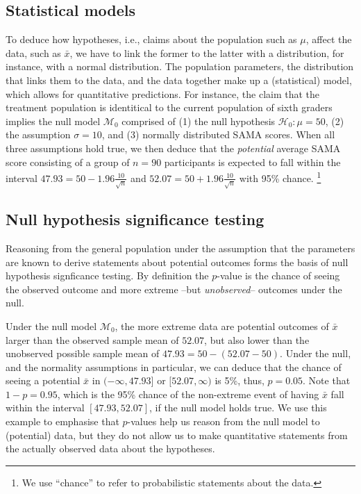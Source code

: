 \documentclass[english,,doc,floatsintext]{apa6}
\let\rmarkdownfootnote\footnote%
\def\footnote{\protect\rmarkdownfootnote}
\begin{document}
\hypertarget{statistical-models}{%
\subsection{Statistical models}\label{statistical-models}}

To deduce how hypotheses, i.e., claims about the population such as \(\mu\), affect the data, such as \(\bar{x}\), we have to link the former to the latter with a distribution, for instance, with a normal distribution. The population parameters, the distribution that links them to the data, and the data together make up a (statistical) model, which allows for quantitative predictions. For instance, the claim that the treatment population is identitical to the current population of sixth graders implies the null model \(\mathcal{M}_{0}\) comprised of (1) the null hypothesis \(\mathcal{H}_{0}: \mu = 50\), (2) the assumption \(\sigma = 10\), and (3) normally distributed SAMA scores. When all three assumptions hold true, we then deduce that the \emph{potential} average SAMA score consisting of a group of \(n = 90\) participants is expected to fall within the interval \(47.93 = 50 - 1.96 \frac{10}{\sqrt{n}}\) and \(52.07 = 50 + 1.96 \frac{10}{\sqrt{n}}\) with 95\% chance.
\footnote{We use ``chance'' to refer to probabilistic statements about the data.}

\subsection{Null hypothesis significance testing}

Reasoning from the general population under the assumption that the parameters are known to derive statements about potential outcomes forms the basis of null hypothesis signficance testing. By definition the \(p\)-value is the chance of seeing the observed outcome and more extreme --but \emph{unobserved}-- outcomes under the null.

Under the null model \(\mathcal{M}_{0}\), the more extreme data are potential outcomes of \(\bar{x}\) larger than the observed sample mean of \(52.07\), but also lower than the unobserved possible sample mean of \(47.93 = 50 - (52.07-50)\). Under the null, and the normality assumptions in particular, we can deduce that the chance of seeing a potential \(\bar{x}\) in \((- \infty, 47.93]\) or \([52.07, \infty)\) is 5\%, thus, \(p=0.05\). Note that \(1 - p = 0.95\), which is the 95\% chance of the non-extreme event of having \(\bar{x}\) fall within the interval \([47.93, 52.07]\), if the null model holds true. We use this example to emphasise that \(p\)-values help us reason from the null model to (potential) data, but they do not allow us to make quantitative statements from the actually observed data about the hypotheses.
\end{document}
